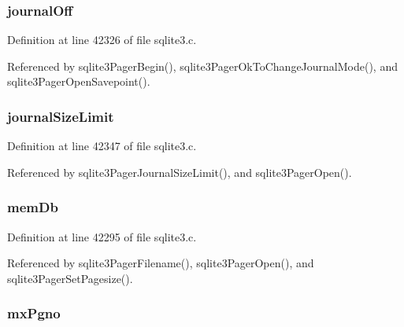 \subsubsection[{journal\+Off}]{ journal\+Off}\label{struct_pager_af4f5415276d71ec77ce45bb650e04d58}


Definition at line 42326 of file sqlite3.\+c.



Referenced by sqlite3\+Pager\+Begin(), sqlite3\+Pager\+Ok\+To\+Change\+Journal\+Mode(), and sqlite3\+Pager\+Open\+Savepoint().

\hypertarget{struct_pager_aada024f938738bdded1f7d066086dced}{}
\subsubsection[{journal\+Size\+Limit}]{ journal\+Size\+Limit}\label{struct_pager_aada024f938738bdded1f7d066086dced}


Definition at line 42347 of file sqlite3.\+c.



Referenced by sqlite3\+Pager\+Journal\+Size\+Limit(), and sqlite3\+Pager\+Open().

\hypertarget{struct_pager_a82aca84cd2805113446482e41bc94c2c}{}
\subsubsection[{mem\+Db}]{ mem\+Db}\label{struct_pager_a82aca84cd2805113446482e41bc94c2c}


Definition at line 42295 of file sqlite3.\+c.



Referenced by sqlite3\+Pager\+Filename(), sqlite3\+Pager\+Open(), and sqlite3\+Pager\+Set\+Pagesize().

\hypertarget{struct_pager_a4296f399610c7c39ee6187340ea5666d}{}
\subsubsection[{mx\+Pgno}]{ mx\+Pgno}\label{struct_pager_a4296f399610c7c39ee6187340ea5666d}


